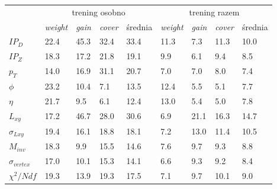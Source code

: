 \begin{tabular}{l|llll|llll}
\toprule
{} & \multicolumn{4}{c|}{trening osobno} & \multicolumn{4}{|c}{trening razem} \\
{} & \textit{weight} & \textit{gain} & \textit{cover} & średnia & \textit{weight} &   \textit{gain} &  \textit{cover} & średnia \\
\midrule
$IP_D$ &     22.4 &   45.3 &    32.4 &       33.4 &   11.3 &  7.3 &  11.3 &     10.0 \\
$IP_Z$ &     18.3 &   17.2 &    21.8 &       19.1 &    9.9 &  6.1 &   9.4 &      8.5 \\
$p_T$               &     14.0 &   16.9 &    31.1 &       20.7 &    7.0 &  7.0 &   8.0 &      7.4 \\
$\phi$              &     23.2 &   10.4 &     7.1 &       13.5 &   12.4 &  5.5 &   5.1 &      7.7 \\
$\eta$              &     21.7 &    9.5 &     6.1 &       12.4 &   13.0 &  5.4 &   5.0 &      7.8 \\
\cline{1-5}
$L_{xy}$              &     17.2 &   46.7 &    28.0 &       30.6 &    6.9 & 21.1 &  16.3 &     14.7 \\
$\sigma_{Lxy} $       &     19.4 &   16.1 &    18.8 &       18.1 &    7.2 & 13.0 &  11.4 &     10.5 \\
$M_{inv}$             &     18.3 &    9.9 &    15.5 &       14.6 &    7.6 &  9.7 &   9.3 &      8.8 \\
$\sigma_{vertex}$       &     17.0 &   10.1 &    15.3 &       14.1 &    6.6 &  9.3 &   9.2 &      8.4 \\
$\chi^2/Ndf$             &     19.3 &   13.9 &    19.3 &       17.5 &    7.1 &  9.7 &  10.1 &      9.0 \\
\bottomrule
\end{tabular}



